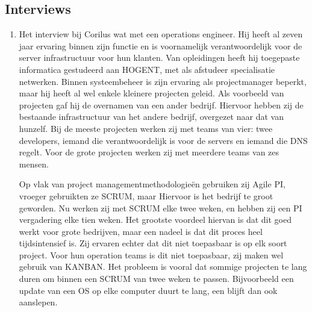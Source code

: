 \documentclass{article}
\begin{document}
    \subsection{Interviews}
    \begin{enumerate}
        \item Het interview bij Corilus wat met een operations engineer. Hij heeft al zeven jaar ervaring binnen zijn 
        functie en is voornamelijk verantwoordelijk voor de server infrastructuur voor hun klanten. Van opleidingen
        heeft hij toegepaste informatica gestudeerd aan HOGENT, met als afstudeer specialisatie netwerken. Binnen
        systeembeheer is zijn ervaring als projectmanager beperkt, maar hij heeft al wel enkele kleinere projecten
        geleid. Als voorbeeld van projecten gaf hij de overnamen van een ander bedrijf. Hiervoor hebben
        zij de bestaande infrastructuur van het andere bedrijf, overgezet naar dat van hunzelf. Bij de meeste
        projecten werken zij met teams van vier: twee developers, iemand die verantwoordelijk is voor de servers en
        iemand die DNS regelt. Voor de grote projecten werken zij met meerdere teams van zes mensen.

        Op vlak van project managementmethodologieën gebruiken zij Agile PI, vroeger gebruikten ze SCRUM, maar Hiervoor
        is het bedrijf te groot geworden. Nu werken zij met SCRUM elke twee weken, en hebben zij een PI vergadering elke
        tien weken. Het grootste voordeel hiervan is dat dit goed werkt voor grote bedrijven, maar een nadeel is dat
        dit proces heel tijdsintensief is. Zij ervaren echter dat dit niet toepasbaar is op elk soort project. Voor
        hun operation teams is dit niet toepasbaar, zij maken wel gebruik van KANBAN. Het probleem is vooral dat sommige
        projecten te lang duren om binnen een SCRUM van twee weken te passen. Bijvoorbeeld een update van een OS op elke
        computer duurt te lang, een blijft dan ook aanslepen.
    \end{enumerate}
\end{document}
